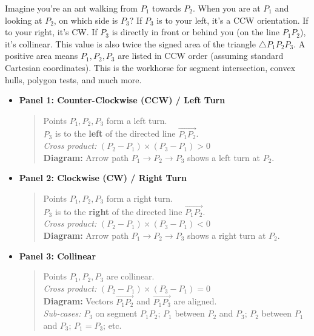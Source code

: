 \begin{intuition}
\label{intuition:A.1.4.orientation}
Imagine you're an ant walking from $P_1$ towards $P_2$. When you are at $P_1$ and looking at $P_2$, on which side is $P_3$? If $P_3$ is to your left, it's a CCW orientation. If to your right, it's CW. If $P_3$ is directly in front or behind you (on the line $P_1P_2$), it's collinear.
This value is also twice the signed area of the triangle $\triangle P_1P_2P_3$. A positive area means $P_1, P_2, P_3$ are listed in CCW order (assuming standard Cartesian coordinates).
This is the workhorse for segment intersection, convex hulls, polygon tests, and much more.
\end{intuition}

\begin{visualexample}
\label{vis:A.1.4.orientation_cases}
\begin{itemize}
    \item \textbf{Panel 1: Counter-Clockwise (CCW) / Left Turn}
    \begin{quote}
        Points $P_1, P_2, P_3$ form a left turn.\\
        $P_3$ is to the \textbf{left} of the directed line $\vec{P_1P_2}$.\\
        \textit{Cross product:} $(P_2{-}P_1) \times (P_3{-}P_1) > 0$\\
        \textbf{Diagram:} Arrow path $P_1 \to P_2 \to P_3$ shows a left turn at $P_2$.
    \end{quote}

    \item \textbf{Panel 2: Clockwise (CW) / Right Turn}
    \begin{quote}
        Points $P_1, P_2, P_3$ form a right turn.\\
        $P_3$ is to the \textbf{right} of the directed line $\vec{P_1P_2}$.\\
        \textit{Cross product:} $(P_2{-}P_1) \times (P_3{-}P_1) < 0$\\
        \textbf{Diagram:} Arrow path $P_1 \to P_2 \to P_3$ shows a right turn at $P_2$.
    \end{quote}

    \item \textbf{Panel 3: Collinear}
    \begin{quote}
        Points $P_1, P_2, P_3$ are collinear.\\
        \textit{Cross product:} $(P_2{-}P_1) \times (P_3{-}P_1) = 0$\\
        \textbf{Diagram:} Vectors $\vec{P_1P_2}$ and $\vec{P_1P_3}$ are aligned.\\
        \textit{Sub-cases:} $P_3$ on segment $P_1P_2$; $P_1$ between $P_2$ and $P_3$; $P_2$ between $P_1$ and $P_3$; $P_1 = P_3$; etc.
    \end{quote}
\end{itemize}
\end{visualexample}

